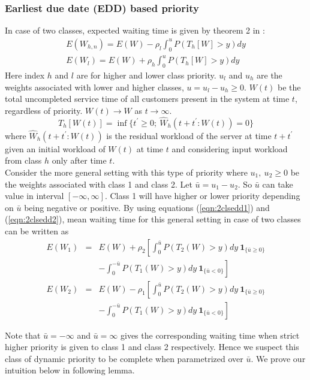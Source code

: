 \documentclass[a4paper,12pt]{article}
\begin{document}
\subsubsection{\textbf{Earliest due date (EDD) based priority}}
In case of two classes, expected waiting time is given by theorem 2 in \cite{EDDpriority}:
\begin{eqnarray}\label{eqn:2clsedd1}
E(W_{h,n}) = E(W) - \rho_l \int_0^u P(T_h[W] > y)dy\\
E(W_l) = E(W) + \rho_h \int_0^u P(T_h[W] > y)dy\label{eqn:2clsedd2}
\end{eqnarray}
Here index $h$ and $l$ are for higher and lower class priority. $u_l$ and $u_h$ are the weights associated with lower and higher classes, $u = u_l - u_h \geq 0$. $W(t)$ be the total uncompleted service time of all customers present in the system at time $t$, regardless of priority. $W(t) \rightarrow W$ as $t \rightarrow \infty $.
$$T_h[W(t)] = \inf\{t^{'} \geq  0 ;~ \hat{W}_h(t+t^{'}: W(t)) = 0\}$$
where $\hat{W}_h(t+t^{'}: W(t))$ is the residual workload of the server at time $t+t^{'}$ given an initial workload of $W(t)$ at time $t$ and considering input workload from class $h$ only after time $t$.\\
\indent Consider the more general setting with this type of priority where $u_1 ,~ u_2 \geq 0$ be the weights associated with class 1 and class 2. Let $\bar{u} = u_1 - u_2$. So $\bar{u}$ can take value in interval $[ -\infty, \infty]$. Class 1 will have higher or lower priority depending on $\bar{u}$ being negative or positive. By using equations (\ref{eqn:2clsedd1}) and (\ref{eqn:2clsedd2}), mean waiting time for this general setting in case of two classes can be written as  
 \begin{eqnarray}\label{eqn:EDDcombined1}\nonumber
 E(W_1) &=& E(W) + \rho_2\left[\int_0^{\bar{u}}P(T_2(W) > y)dy ~\mathbf{1}_{\{\bar{u} \geq 0\}}\right.\\
 && \left.-\int_0^{-\bar{u}}P(T_1(W) > y)dy ~\mathbf{1}_{\{\bar{u} < 0\}} \right]\\\nonumber
  E(W_2) &=& E(W) - \rho_1\left[\int_0^{\bar{u}}P(T_2(W) > y)dy ~\mathbf{1}_{\{\bar{u} \geq 0\}}\right.\\
  && \left. -\int_0^{-\bar{u}}P(T_1(W) > y)dy ~\mathbf{1}_{\{\bar{u} < 0\}} \right]\label{eqn:EDDcombined2}
 \end{eqnarray}
 
  Note that $\bar{u} = -\infty $ and $\bar{u} = \infty$ gives the corresponding waiting time when strict higher priority is given to class 1 and class 2 respectively. Hence we suspect this class of dynamic priority to be complete when parametrized over $\bar{u}$. We prove our intuition below in following lemma.
  
\end{document}
